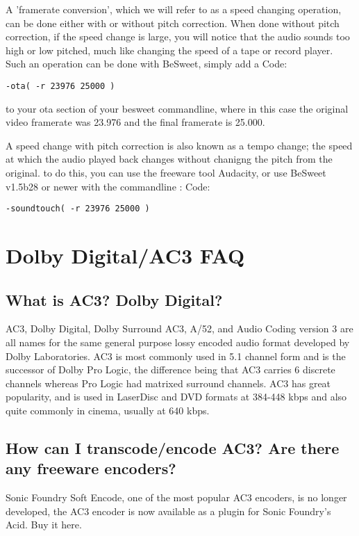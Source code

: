 ﻿\documentclass[12pt]{article}
\begin{document}
A 'framerate conversion', which we will refer to as a speed changing operation, can be done either
with or without pitch correction. When done without pitch correction, if the speed change is large,
you will notice that the audio sounds too high or low pitched, much like changing the speed of a
tape or record player. Such an operation can be done with BeSweet, simply add a Code:
\begin{lstlisting}
-ota( -r 23976 25000 )
\end{lstlisting}

to your ota section of your besweet commandline, where in this case the original video framerate was
23.976 and the final framerate is 25.000.

A speed change with pitch correction is also known as a tempo change; the speed at which the audio
played back changes without chanigng the pitch from the original. to do this, you can use the
freeware tool Audacity, or use BeSweet v1.5b28 or newer with the commandline : Code:
\begin{lstlisting}
-soundtouch( -r 23976 25000 )
\end{lstlisting}


\section{Dolby Digital/AC3 FAQ}

\subsection{What is AC3? Dolby Digital?}

AC3, Dolby Digital, Dolby Surround AC3, A/52, and Audio Coding version 3 are all names for the same
general purpose lossy encoded audio format developed by Dolby Laboratories. AC3 is most commonly
used in 5.1 channel form and is the successor of Dolby Pro Logic, the difference being that AC3
carries 6 discrete channels whereas Pro Logic had matrixed surround channels. AC3 has great
popularity, and is used in LaserDisc and DVD formats at 384-448 kbps and also quite commonly in
cinema, usually at 640 kbps.

\subsection{How can I transcode/encode AC3? Are there any freeware encoders?}

Sonic Foundry Soft Encode, one of the most popular AC3 encoders, is no longer developed, the AC3
encoder is now available as a plugin for Sonic Foundry's Acid. Buy it here.
\end{document}
